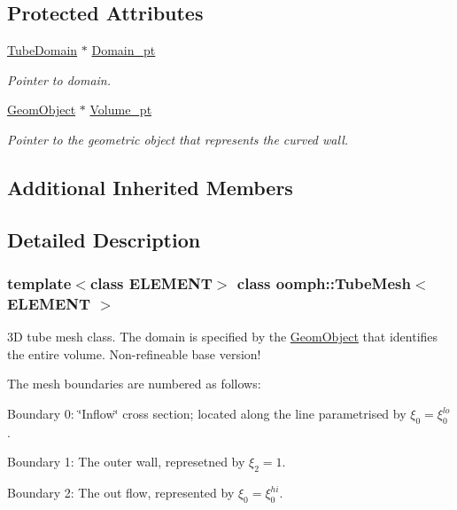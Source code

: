 \subsection*{Protected Attributes}
\begin{DoxyCompactItemize}
\item 
\hyperlink{classoomph_1_1TubeDomain}{Tube\+Domain} $\ast$ \hyperlink{classoomph_1_1TubeMesh_aa40f91e3d55b4ab61304d0b8eca3859f}{Domain\+\_\+pt}
\begin{DoxyCompactList}\small\item\em Pointer to domain. \end{DoxyCompactList}\item 
\hyperlink{classoomph_1_1GeomObject}{Geom\+Object} $\ast$ \hyperlink{classoomph_1_1TubeMesh_a3b89c07eff15d0eb9d5fe9e0c93f8ec2}{Volume\+\_\+pt}
\begin{DoxyCompactList}\small\item\em Pointer to the geometric object that represents the curved wall. \end{DoxyCompactList}\end{DoxyCompactItemize}
\subsection*{Additional Inherited Members}


\subsection{Detailed Description}
\subsubsection*{template$<$class E\+L\+E\+M\+E\+NT$>$\newline
class oomph\+::\+Tube\+Mesh$<$ E\+L\+E\+M\+E\+N\+T $>$}

3D tube mesh class. The domain is specified by the \hyperlink{classoomph_1_1GeomObject}{Geom\+Object} that identifies the entire volume. Non-\/refineable base version! 

The mesh boundaries are numbered as follows\+:
\begin{DoxyItemize}
\item Boundary 0\+: \char`\"{}\+Inflow\char`\"{} cross section; located along the line parametrised by $ \xi_0 = \xi_0^{lo} $.
\item Boundary 1\+: The outer wall, represetned by $\xi_2 = 1$.
\item Boundary 2\+: The out flow, represented by $\xi_0 = \xi_0^{hi}$. 
\end{DoxyItemize}

